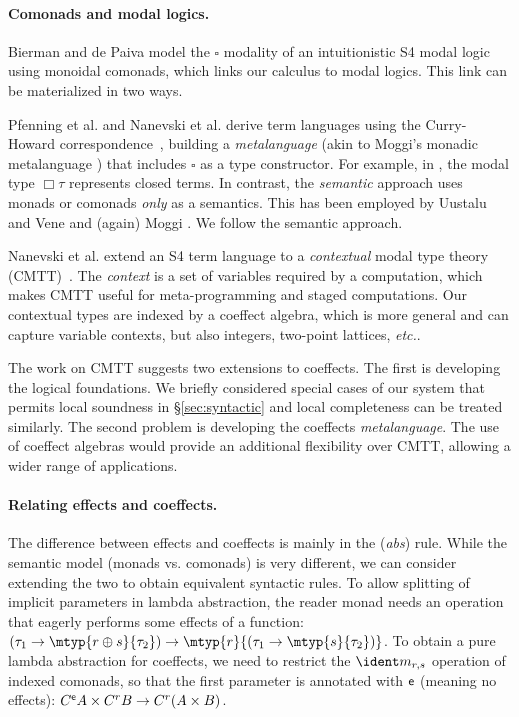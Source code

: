 \vspace{-1em}
\paragraph{Comonads and modal logics.}

Bierman and de Paiva \cite{logic-intuitionistic-modal} model the
$\square$ modality of an intuitionistic S4 modal logic using monoidal
comonads, which links our calculus to modal logics.  This link can be
materialized in two ways.

Pfenning et al. and Nanevski et al.  derive term languages using the Curry-Howard
correspondence~\cite{logic-modal-reconstruction,logic-intuitionistic-modal,logic-cmtt},
building a \emph{metalanguage} (akin to Moggi's monadic metalanguage
\cite{monad-notions}) that includes $\square$ as a type
constructor. For example, in \cite{logic-modal-reconstruction}, the
modal type $\Box \tau$ represents closed terms.
In contrast, the \emph{semantic} approach uses monads or comonads
\emph{only} as a semantics.  This has been employed by Uustalu and
Vene and (again) Moggi \cite{monad-notions,comonads-notions}.  We
follow the semantic approach.

Nanevski et al. extend an S4 term language to a \emph{contextual}
modal type theory (CMTT)~\cite{logic-cmtt}.
The \emph{context} is a set of variables required by a computation, which
makes CMTT useful for meta-programming and staged computations. Our contextual types are
indexed by a coeffect algebra, which is more general and can capture
variable contexts, but also integers, two-point lattices, \emph{etc.}.

The work on CMTT suggests two extensions to coeffects. The first is
developing the logical foundations. We briefly considered special cases
of our system that permits local soundness in \S\ref{sec:syntactic} and
local completeness can be treated similarly. The second problem is 
developing the coeffects \emph{metalanguage}. The use of coeffect algebras
would provide an additional flexibility over CMTT, allowing a wider range 
of applications.


\vspace{-1em}
\paragraph{Relating effects and coeffects.} 
The difference between effects and coeffects is mainly in the (\emph{abs}) rule. While the 
semantic model (monads vs. comonads) is very different, we can consider extending the two to 
obtain equivalent syntactic rules. To allow splitting of implicit parameters in lambda abstraction, 
the reader monad needs an operation that eagerly performs some effects of a function: 
$(\tau_1 \rightarrow \mtyp{r \oplus s}{\tau_2}) \rightarrow \mtyp{r}{(\tau_1 \rightarrow \mtyp{s}{\tau_2})}$.
To obtain a pure lambda abstraction
for coeffects, we need to restrict the $\cmerge_{r, s}$ 
operation of indexed comonads, so that the first parameter is annotated with $\mathsf{e}$ (meaning
no effects): $C^{\mathsf{e}} A \times C^{r} B \rightarrow C^{r}(A \times B)$.

